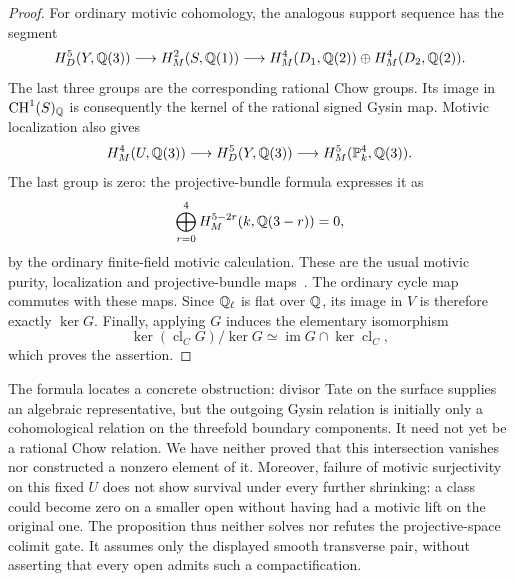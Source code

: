 \begin{proof}
For ordinary motivic cohomology, the analogous support sequence
has the segment
\[
 H^5_D(Y,\mathbb Q(3))\longrightarrow
 H_M^2(S,\mathbb Q(1))\longrightarrow
 H_M^4(D_1,\mathbb Q(2))\oplus H_M^4(D_2,\mathbb Q(2)).
\]
The last three groups are the corresponding rational Chow
groups.  Its image in \(\operatorname{CH}^1(S)_\mathbb Q\)
is consequently the kernel of the rational signed Gysin map.
Motivic localization also gives
\[
 H_M^4(U,\mathbb Q(3))\longrightarrow H^5_D(Y,\mathbb Q(3))
                   \longrightarrow H_M^5(\mathbb P^4_k,\mathbb Q(3)).
\]
The last group is zero: the projective-bundle formula expresses it as
\[
 \bigoplus_{r=0}^4 H_M^{5-2r}(k,\mathbb Q(3-r))=0,
\]
by the ordinary finite-field motivic calculation.  These are
the usual motivic purity, localization and projective-bundle
maps~\cite[(14.5.1), Theorem~15.12, Corollary~15.13,
Theorem~15.15]{BMVW2006}.
The ordinary cycle map commutes with these maps.  Since
\(\mathbb Q_\ell\) is flat over \(\mathbb Q\), its image in \(V\)
is therefore exactly \(\ker G\).  Finally, applying \(G\)
induces the elementary isomorphism
\[
 \ker(\operatorname{cl}_C G)/\ker G
       \simeq\operatorname{im}G\cap\ker\operatorname{cl}_C,
\]
which proves the assertion.
\end{proof}

The formula locates a concrete obstruction: divisor Tate on the
surface supplies an algebraic representative, but the outgoing
Gysin relation is initially only a cohomological relation on the
threefold boundary components.  It need not yet be a rational
Chow relation.  We have neither proved that this intersection
vanishes nor constructed a nonzero element of it.
Moreover, failure of motivic surjectivity on this fixed \(U\)
does not show survival under every further shrinking: a class
could become zero on a smaller open without having had a motivic
lift on the original one.  The proposition thus neither solves
nor refutes the projective-space colimit gate.  It assumes only
the displayed smooth transverse pair, without asserting that
every open admits such a compactification.
